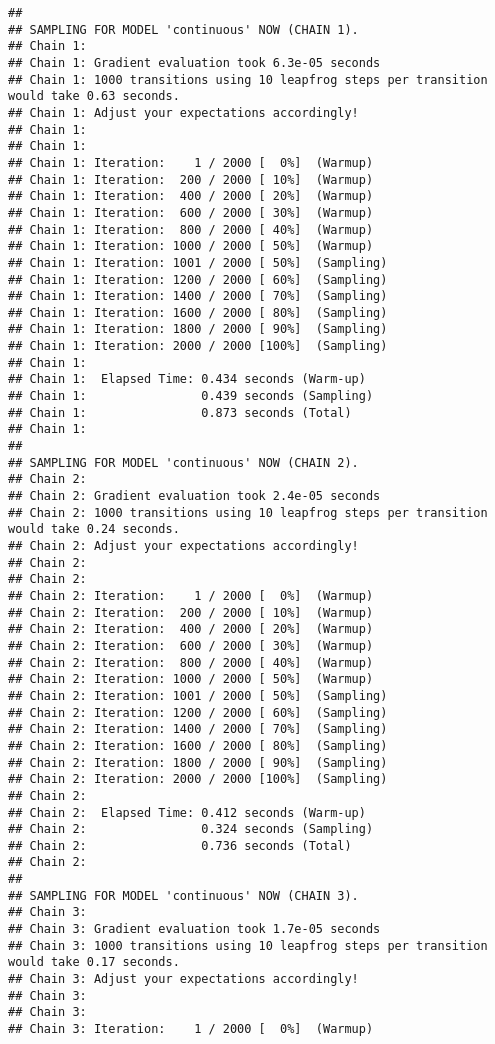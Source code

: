 \documentclass[
]{article}
\begin{document}
\begin{verbatim}
## 
## SAMPLING FOR MODEL 'continuous' NOW (CHAIN 1).
## Chain 1: 
## Chain 1: Gradient evaluation took 6.3e-05 seconds
## Chain 1: 1000 transitions using 10 leapfrog steps per transition would take 0.63 seconds.
## Chain 1: Adjust your expectations accordingly!
## Chain 1: 
## Chain 1: 
## Chain 1: Iteration:    1 / 2000 [  0%]  (Warmup)
## Chain 1: Iteration:  200 / 2000 [ 10%]  (Warmup)
## Chain 1: Iteration:  400 / 2000 [ 20%]  (Warmup)
## Chain 1: Iteration:  600 / 2000 [ 30%]  (Warmup)
## Chain 1: Iteration:  800 / 2000 [ 40%]  (Warmup)
## Chain 1: Iteration: 1000 / 2000 [ 50%]  (Warmup)
## Chain 1: Iteration: 1001 / 2000 [ 50%]  (Sampling)
## Chain 1: Iteration: 1200 / 2000 [ 60%]  (Sampling)
## Chain 1: Iteration: 1400 / 2000 [ 70%]  (Sampling)
## Chain 1: Iteration: 1600 / 2000 [ 80%]  (Sampling)
## Chain 1: Iteration: 1800 / 2000 [ 90%]  (Sampling)
## Chain 1: Iteration: 2000 / 2000 [100%]  (Sampling)
## Chain 1: 
## Chain 1:  Elapsed Time: 0.434 seconds (Warm-up)
## Chain 1:                0.439 seconds (Sampling)
## Chain 1:                0.873 seconds (Total)
## Chain 1: 
## 
## SAMPLING FOR MODEL 'continuous' NOW (CHAIN 2).
## Chain 2: 
## Chain 2: Gradient evaluation took 2.4e-05 seconds
## Chain 2: 1000 transitions using 10 leapfrog steps per transition would take 0.24 seconds.
## Chain 2: Adjust your expectations accordingly!
## Chain 2: 
## Chain 2: 
## Chain 2: Iteration:    1 / 2000 [  0%]  (Warmup)
## Chain 2: Iteration:  200 / 2000 [ 10%]  (Warmup)
## Chain 2: Iteration:  400 / 2000 [ 20%]  (Warmup)
## Chain 2: Iteration:  600 / 2000 [ 30%]  (Warmup)
## Chain 2: Iteration:  800 / 2000 [ 40%]  (Warmup)
## Chain 2: Iteration: 1000 / 2000 [ 50%]  (Warmup)
## Chain 2: Iteration: 1001 / 2000 [ 50%]  (Sampling)
## Chain 2: Iteration: 1200 / 2000 [ 60%]  (Sampling)
## Chain 2: Iteration: 1400 / 2000 [ 70%]  (Sampling)
## Chain 2: Iteration: 1600 / 2000 [ 80%]  (Sampling)
## Chain 2: Iteration: 1800 / 2000 [ 90%]  (Sampling)
## Chain 2: Iteration: 2000 / 2000 [100%]  (Sampling)
## Chain 2: 
## Chain 2:  Elapsed Time: 0.412 seconds (Warm-up)
## Chain 2:                0.324 seconds (Sampling)
## Chain 2:                0.736 seconds (Total)
## Chain 2: 
## 
## SAMPLING FOR MODEL 'continuous' NOW (CHAIN 3).
## Chain 3: 
## Chain 3: Gradient evaluation took 1.7e-05 seconds
## Chain 3: 1000 transitions using 10 leapfrog steps per transition would take 0.17 seconds.
## Chain 3: Adjust your expectations accordingly!
## Chain 3: 
## Chain 3: 
## Chain 3: Iteration:    1 / 2000 [  0%]  (Warmup)

\end{verbatim}
\end{document}
